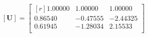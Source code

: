 \begin{equation}
  \label{eq:raymodefree}
  [\mathbf{U}] = \begin{bmatrix*}[r]
	1.00000 & 1.00000 & 1.00000 \\
	0.86540 &-0.47555 &-2.44325 \\
	0.61945 &-1.28034 & 2.15533 \\
  \end{bmatrix*}
\end{equation}
%
